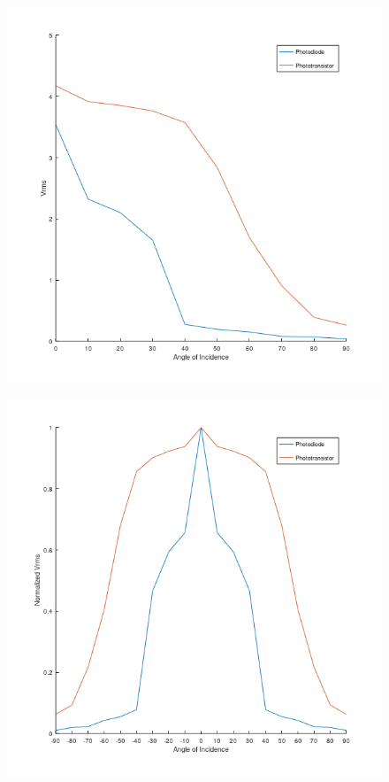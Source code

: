 \begin{figure}[H]
	\centering
	\begin{minipage}{.4\linewidth}
		\centering
		\includegraphics[width=\textwidth]{figures/results/vrms_vs_incidence_square.png}
		\label{fig:vrms_vs_angle_of_incidence}
	\end{minipage}
	\hspace{.1\linewidth}
	\begin{minipage}{.4\linewidth}
		\centering
		\includegraphics[width=\textwidth]{figures/results/beam_pattern_square.png}
		\label{fig:beam_pattern}
	\end{minipage}
\end{figure}

